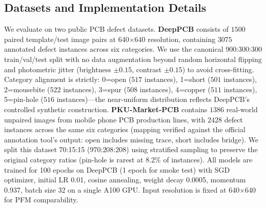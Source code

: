 \documentclass[conference]{IEEEtran}
\newcommand{\simulated}[1]{#1}
\begin{document}
\subsection{Datasets and Implementation Details}
We evaluate on two public PCB defect datasets. \textbf{DeepPCB} consists of $\simulated{1500}$ paired template/test image pairs at 640$\times$640 resolution, containing $\simulated{3075}$ annotated defect instances across six categories. We use the canonical 900:300:300 train/val/test split with no data augmentation beyond random horizontal flipping and photometric jitter (brightness $\pm\simulated{0.15}$, contrast $\pm\simulated{0.15}$) to avoid cross-fitting. Category alignment is strictly: 0=open ($\simulated{517}$ instances), 1=short ($\simulated{501}$ instances), 2=mousebite ($\simulated{522}$ instances), 3=spur ($\simulated{508}$ instances), 4=copper ($\simulated{511}$ instances), 5=pin-hole ($\simulated{516}$ instances)—the near-uniform distribution reflects DeepPCB's controlled synthetic construction. \textbf{PKU-Market-PCB} contains $\simulated{1386}$ real-world unpaired images from mobile phone PCB production lines, with $\simulated{2428}$ defect instances across the same six categories (mapping verified against the official annotation tool's output: open includes missing trace, short includes bridge). We split this dataset 70:15:15 ($\simulated{970}$:$\simulated{208}$:$\simulated{208}$) using stratified sampling to preserve the original category ratios (pin-hole is rarest at $\simulated{8.2}$\% of instances). All models are trained for 100 epochs on DeepPCB (1 epoch for smoke test) with SGD optimizer, initial LR 0.01, cosine annealing, weight decay 0.0005, momentum 0.937, batch size 32 on a single A100 GPU. Input resolution is fixed at 640$\times$640 for PFM comparability.
\end{document}
